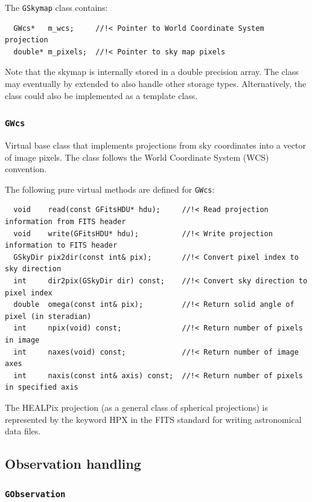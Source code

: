 \documentclass{article}[12pt,a4]
\begin{document}
The {\tt GSkymap} class contains:
\begin{verbatim}
  GWcs*   m_wcs;     //!< Pointer to World Coordinate System projection
  double* m_pixels;  //!< Pointer to sky map pixels
\end{verbatim}

Note that the skymap is internally stored in a double precision array.
The class may eventually by extended to also handle other storage types.
Alternatively, the class could also be implemented as a template class.


\subsubsection{{\tt GWcs}}

Virtual base class that implements projections from sky coordinates into a vector of
image pixels.
The class follows the World Coordinate System (WCS) convention.

The following pure virtual methods are defined for {\tt GWcs}:
\begin{verbatim}
  void    read(const GFitsHDU* hdu);     //!< Read projection information from FITS header
  void    write(GFitsHDU* hdu);          //!< Write projection information to FITS header
  GSkyDir pix2dir(const int& pix);       //!< Convert pixel index to sky direction
  int     dir2pix(GSkyDir dir) const;    //!< Convert sky direction to pixel index
  double  omega(const int& pix);         //!< Return solid angle of pixel (in steradian)
  int     npix(void) const;              //!< Return number of pixels in image
  int     naxes(void) const;             //!< Return number of image axes
  int     naxis(const int& axis) const;  //!< Return number of pixels in specified axis
\end{verbatim}

The HEALPix projection (as a general class of spherical projections) is represented by the 
keyword HPX in the FITS standard for writing astronomical data files.


\subsection{Observation handling}

\subsubsection{{\tt GObservation}}
\end{document}
